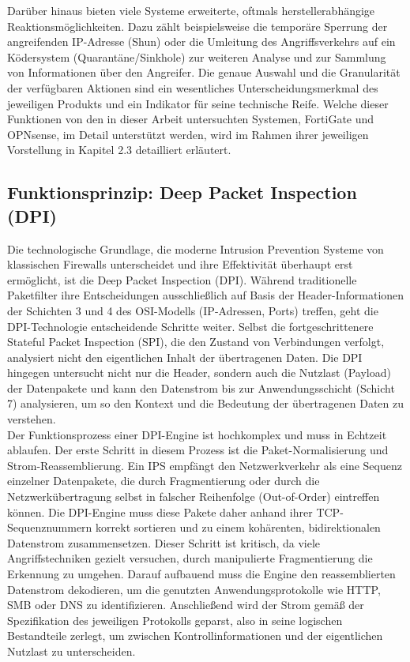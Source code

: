 Darüber hinaus bieten viele Systeme erweiterte, oftmals herstellerabhängige Reaktionsmöglichkeiten. Dazu zählt beispielsweise die temporäre Sperrung der angreifenden IP-Adresse (Shun) oder die Umleitung des Angriffsverkehrs auf ein Ködersystem (Quarantäne/Sinkhole) zur weiteren Analyse und zur Sammlung von Informationen über den Angreifer. Die genaue Auswahl und die Granularität der verfügbaren Aktionen sind ein wesentliches Unterscheidungsmerkmal des jeweiligen Produkts und ein Indikator für seine technische Reife. Welche dieser Funktionen von den in dieser Arbeit untersuchten Systemen, FortiGate und OPNsense, im Detail unterstützt werden, wird im Rahmen ihrer jeweiligen Vorstellung in Kapitel 2.3 detailliert erläutert.
\newpage
\subsection{Funktionsprinzip: Deep Packet Inspection (DPI)}
Die technologische Grundlage, die moderne Intrusion Prevention Systeme von klassischen Firewalls unterscheidet und ihre Effektivität überhaupt erst ermöglicht, ist die Deep Packet Inspection (DPI). Während traditionelle Paketfilter ihre Entscheidungen ausschließlich auf Basis der Header-Informationen der Schichten 3 und 4 des OSI-Modells (IP-Adressen, Ports) treffen, geht die DPI-Technologie entscheidende Schritte weiter. Selbst die fortgeschrittenere Stateful Packet Inspection (SPI), die den Zustand von Verbindungen verfolgt, analysiert nicht den eigentlichen Inhalt der übertragenen Daten. Die DPI hingegen untersucht nicht nur die Header, sondern auch die Nutzlast (Payload) der Datenpakete und kann den Datenstrom bis zur Anwendungsschicht (Schicht 7) analysieren, um so den Kontext und die Bedeutung der übertragenen Daten zu verstehen.\\

Der Funktionsprozess einer DPI-Engine ist hochkomplex und muss in Echtzeit ablaufen. Der erste Schritt in diesem Prozess ist die Paket-Normalisierung und Strom-Reassemblierung. Ein IPS empfängt den Netzwerkverkehr als eine Sequenz einzelner Datenpakete, die durch Fragmentierung oder durch die Netzwerkübertragung selbst in falscher Reihenfolge (Out-of-Order) eintreffen können. Die DPI-Engine muss diese Pakete daher anhand ihrer TCP-Sequenznummern korrekt sortieren und zu einem kohärenten, bidirektionalen Datenstrom zusammensetzen. Dieser Schritt ist kritisch, da viele Angriffstechniken gezielt versuchen, durch manipulierte Fragmentierung die Erkennung zu umgehen. Darauf aufbauend muss die Engine den reassemblierten Datenstrom dekodieren, um die genutzten Anwendungsprotokolle wie HTTP, SMB oder DNS zu identifizieren. Anschließend wird der Strom gemäß der Spezifikation des jeweiligen Protokolls geparst, also in seine logischen Bestandteile zerlegt, um zwischen Kontrollinformationen und der eigentlichen Nutzlast zu unterscheiden.\\

